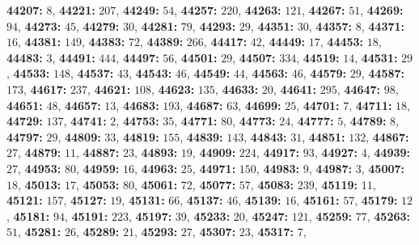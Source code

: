 \textsf{\bfseries 44207:} $8$, \textsf{\bfseries 44221:} $207$, \textsf{\bfseries 44249:} $54$, \textsf{\bfseries 44257:} $220$, \textsf{\bfseries 44263:} $121$, \textsf{\bfseries 44267:} $51$, \textsf{\bfseries 44269:} $94$, \textsf{\bfseries 44273:} $45$, \textsf{\bfseries 44279:} $30$, \textsf{\bfseries 44281:} $79$, \textsf{\bfseries 44293:} $29$, \textsf{\bfseries 44351:} $30$, \textsf{\bfseries 44357:} $8$, \textsf{\bfseries 44371:} $16$, \textsf{\bfseries 44381:} $149$, \textsf{\bfseries 44383:} $72$, \textsf{\bfseries 44389:} $266$, \textsf{\bfseries 44417:} $42$, \textsf{\bfseries 44449:} $17$, \textsf{\bfseries 44453:} $18$, \textsf{\bfseries 44483:} $3$, \textsf{\bfseries 44491:} $444$, \textsf{\bfseries 44497:} $56$, \textsf{\bfseries 44501:} $29$, \textsf{\bfseries 44507:} $334$, \textsf{\bfseries 44519:} $14$, \textsf{\bfseries 44531:} $29$, \textsf{\bfseries 44533:} $148$, \textsf{\bfseries 44537:} $43$, \textsf{\bfseries 44543:} $46$, \textsf{\bfseries 44549:} $44$, \textsf{\bfseries 44563:} $46$, \textsf{\bfseries 44579:} $29$, \textsf{\bfseries 44587:} $173$, \textsf{\bfseries 44617:} $237$, \textsf{\bfseries 44621:} $108$, \textsf{\bfseries 44623:} $135$, \textsf{\bfseries 44633:} $20$, \textsf{\bfseries 44641:} $295$, \textsf{\bfseries 44647:} $98$, \textsf{\bfseries 44651:} $48$, \textsf{\bfseries 44657:} $13$, \textsf{\bfseries 44683:} $193$, \textsf{\bfseries 44687:} $63$, \textsf{\bfseries 44699:} $25$, \textsf{\bfseries 44701:} $7$, \textsf{\bfseries 44711:} $18$, \textsf{\bfseries 44729:} $137$, \textsf{\bfseries 44741:} $2$, \textsf{\bfseries 44753:} $35$, \textsf{\bfseries 44771:} $80$, \textsf{\bfseries 44773:} $24$, \textsf{\bfseries 44777:} $5$, \textsf{\bfseries 44789:} $8$, \textsf{\bfseries 44797:} $29$, \textsf{\bfseries 44809:} $33$, \textsf{\bfseries 44819:} $155$, \textsf{\bfseries 44839:} $143$, \textsf{\bfseries 44843:} $31$, \textsf{\bfseries 44851:} $132$, \textsf{\bfseries 44867:} $27$, \textsf{\bfseries 44879:} $11$, \textsf{\bfseries 44887:} $23$, \textsf{\bfseries 44893:} $19$, \textsf{\bfseries 44909:} $224$, \textsf{\bfseries 44917:} $93$, \textsf{\bfseries 44927:} $4$, \textsf{\bfseries 44939:} $27$, \textsf{\bfseries 44953:} $80$, \textsf{\bfseries 44959:} $16$, \textsf{\bfseries 44963:} $25$, \textsf{\bfseries 44971:} $150$, \textsf{\bfseries 44983:} $9$, \textsf{\bfseries 44987:} $3$, \textsf{\bfseries 45007:} $18$, \textsf{\bfseries 45013:} $17$, \textsf{\bfseries 45053:} $80$, \textsf{\bfseries 45061:} $72$, \textsf{\bfseries 45077:} $57$, \textsf{\bfseries 45083:} $239$, \textsf{\bfseries 45119:} $11$, \textsf{\bfseries 45121:} $157$, \textsf{\bfseries 45127:} $19$, \textsf{\bfseries 45131:} $66$, \textsf{\bfseries 45137:} $46$, \textsf{\bfseries 45139:} $16$, \textsf{\bfseries 45161:} $57$, \textsf{\bfseries 45179:} $12$, \textsf{\bfseries 45181:} $94$, \textsf{\bfseries 45191:} $223$, \textsf{\bfseries 45197:} $39$, \textsf{\bfseries 45233:} $20$, \textsf{\bfseries 45247:} $121$, \textsf{\bfseries 45259:} $77$, \textsf{\bfseries 45263:} $51$, \textsf{\bfseries 45281:} $26$, \textsf{\bfseries 45289:} $21$, \textsf{\bfseries 45293:} $27$, \textsf{\bfseries 45307:} $23$, \textsf{\bfseries 45317:} $7$, 
